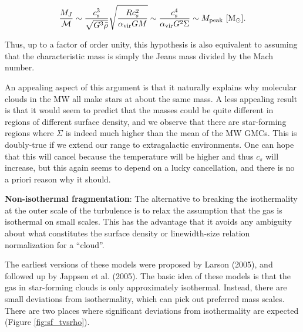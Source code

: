 \documentclass[a4paper,10pt]{article}
\begin{document}
\begin{align*}
    \frac{M_J}{\mathcal{M}} \sim \frac{c_s^3}{\sqrt{G^3\bar{\rho}}} \sqrt{\frac{Rc_s^2}{\alpha_\mathrm{vir}GM}} \sim \frac{c_s^4}{\alpha_\mathrm{vir}G^2\Sigma} \sim M_\mathrm{peak} ~ [{\rm M_\odot}].
\end{align*}

{\noindent}Thus, up to a factor of order unity, this hypothesis is also equivalent to assuming that the characteristic mass is simply the Jeans mass divided by the Mach number.

{\noindent}An appealing aspect of this argument is that it naturally explains why molecular clouds in the MW all make stars at about the same mass. A less appealing result is that it would seem to predict that the masses could be quite different in regions of different surface density, and we observe that there are star-forming regions where $\Sigma$ is indeed much higher than the mean of the MW GMCs. This is doubly-true if we extend our range to extragalactic environments. One can hope that this will cancel because the temperature will be higher and thus $c_s$ will increase, but this again seems to depend on a lucky cancellation, and there is no a priori reason why it should.

{\noindent}\textbf{Non-isothermal fragmentation}: The alternative to breaking the isothermality at the outer scale of the turbulence is to relax the assumption that the gas is isothermal on small scales. This has the advantage that it avoids any ambiguity about what constitutes the surface density or linewidth-size relation normalization for a ``cloud''.

{\noindent}The earliest versions of these models were proposed by Larson (2005), and followed up by Jappsen et al. (2005). The basic idea of these models is that the gas in star-forming clouds is only approximately isothermal. Instead, there are small deviations from isothermality, which can pick out preferred mass scales. There are two places where significant deviations from isothermality are expected (Figure \ref{fig:sf_tvsrho}).
\end{document}
